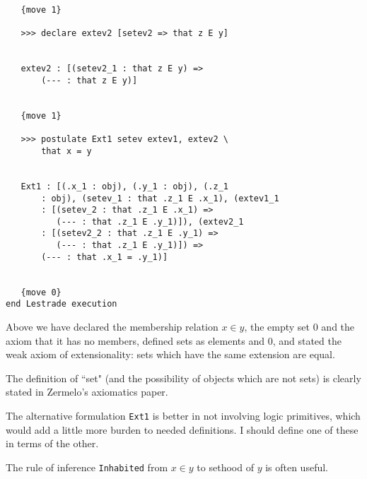 \documentclass[12pt]{article}
\begin{document}
\begin{verbatim}
   {move 1}

   >>> declare extev2 [setev2 => that z E y]


   extev2 : [(setev2_1 : that z E y) => 
       (--- : that z E y)]


   {move 1}

   >>> postulate Ext1 setev extev1, extev2 \
       that x = y


   Ext1 : [(.x_1 : obj), (.y_1 : obj), (.z_1 
       : obj), (setev_1 : that .z_1 E .x_1), (extev1_1 
       : [(setev_2 : that .z_1 E .x_1) => 
          (--- : that .z_1 E .y_1)]), (extev2_1 
       : [(setev2_2 : that .z_1 E .y_1) => 
          (--- : that .z_1 E .y_1)]) => 
       (--- : that .x_1 = .y_1)]


   {move 0}
end Lestrade execution
\end{verbatim}

Above we have declared the membership relation $x \in y$, the empty set 0 and the axiom that it has no members, defined sets as elements and 0, and stated the weak axiom of extensionality:  sets which have the same extension are equal.

The definition of ``set" (and the possibility of objects which are not sets) is clearly stated in Zermelo's axiomatics paper.

The alternative formulation {\tt Ext1} is better in not involving logic primitives, which would add a little more burden to needed definitions.  I should define one of these in terms of the other.

The  rule of inference {\tt Inhabited} from $x \in y$ to sethood of $y$ is often useful.
\end{document}
